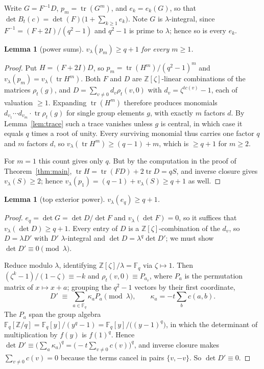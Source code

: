 \documentclass[11pt]{article}
\theoremstyle{plain}
\newtheorem{lemma}[theorem]{Lemma}
\theoremstyle{definition}
\newcommand{\FF}{\mathbb F}
\newcommand{\ZZ}{\mathbb Z}
\newcommand{\tr}{\operatorname{tr}}
\newcommand{\vlam}{v_\lambda}
\begin{document}
Write $G=F^{-1}D$, $p_m=\tr(G^m)$, and $e_k=e_k(G)$, so that
$\det B_t(c)=\det(F)\bigl(1+\sum_{k\ge1}e_k\bigr)$. Note $G$ is
$\lambda$-integral, since $F^{-1}=(F+2I)/(q^2-1)$ and $q^2-1$ is prime to
$\lambda$; hence so is every $e_k$.

\begin{lemma}[power sums]\label{lem:power}
$\vlam(p_m)\ge q+1$ for every $m\ge1$.
\end{lemma}

\begin{proof}
Put $H=(F+2I)D$, so $p_m=\tr(H^m)/(q^2-1)^m$ and
$\vlam(p_m)=\vlam(\tr H^m)$. Both $F$ and $D$ are $\ZZ[\zeta]$-linear
combinations of the matrices $\rho_t(g)$, and $D=\sum_{v\neq0}d_v\rho_t(v,0)$
with $d_v=\zeta^{tc(v)}-1$, each of valuation $\ge1$. Expanding $\tr(H^m)$
therefore produces monomials
$d_{v_1}\cdots d_{v_m}\cdot\tr\rho_t(g)$ for single group elements $g$, with
exactly $m$ factors $d$. By Lemma~\ref{lem:trace} such a trace vanishes unless
$g$ is central, in which case it equals $q$ times a root of unity. Every
surviving monomial thus carries one factor $q$ and $m$ factors $d$, so
$\vlam(\tr H^m)\ge(q-1)+m$, which is $\ge q+1$ for $m\ge2$.

For $m=1$ this count gives only $q$. But by the computation in the proof of
Theorem~\ref{thm:main}, $\tr H=\tr(FD)+2\tr D=qS$, and inverse closure gives
$\vlam(S)\ge2$; hence $\vlam(p_1)=(q-1)+\vlam(S)\ge q+1$ as well.
\end{proof}

\begin{lemma}[top exterior power]\label{lem:top}
$\vlam(e_q)\ge q+1$.
\end{lemma}

\begin{proof}
$e_q=\det G=\det D/\det F$ and $\vlam(\det F)=0$, so it suffices that
$\vlam(\det D)\ge q+1$. Every entry of $D$ is a $\ZZ[\zeta]$-combination of the
$d_v$, so $D=\lambda D'$ with $D'$ $\lambda$-integral and
$\det D=\lambda^{q}\det D'$; we must show $\det D'\equiv0\pmod\lambda$.

Reduce modulo $\lambda$, identifying $\ZZ[\zeta]/\lambda=\FF_q$ via
$\zeta\mapsto1$. Then $(\zeta^{k}-1)/(1-\zeta)\equiv-k$ and
$\rho_t(v,0)\equiv P_{a_v}$, where $P_a$ is the permutation matrix of
$x\mapsto x+a$; grouping the $q^2-1$ vectors by their first coordinate,
\[
D'\;\equiv\;\sum_{a\in\FF_q}\kappa_a P_a \pmod\lambda,
\qquad
\kappa_a=-t\sum_{b}c(a,b).
\]
The $P_a$ span the group algebra
$\FF_q[\ZZ/q]=\FF_q[y]/(y^{q}-1)=\FF_q[y]/\bigl((y-1)^{q}\bigr)$, in which the
determinant of multiplication by $f(y)$ is $f(1)^{q}$. Hence
$\det D'\equiv\bigl(\sum_a\kappa_a\bigr)^{q}
=\bigl(-t\sum_{v\neq0}c(v)\bigr)^{q}$, and inverse closure makes
$\sum_{v\neq0}c(v)=0$ because the terms cancel in pairs $\{v,-v\}$. So
$\det D'\equiv0$.
\end{proof}
\end{document}
